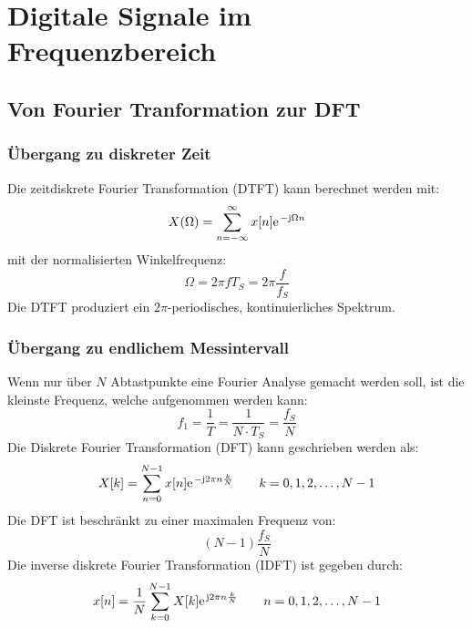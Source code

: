 



\chapter{Digitale Signale im Frequenzbereich}
\section{Von Fourier Tranformation zur DFT}
\subsection{Übergang zu diskreter Zeit}
Die zeitdiskrete Fourier Transformation (DTFT) kann berechnet werden mit:
\[ X(\Omega) = \sum_{n=-\infty}^{\infty} x[n]\e^{-\im\Omega n} \]
mit der normalisierten Winkelfrequenz:
\[ \Omega = 2\pi f T_S = 2\pi\frac{f}{f_S} \]
Die DTFT produziert ein $2\pi$-periodisches, kontinuierliches Spektrum.

\subsection{Übergang zu endlichem Messintervall}
Wenn nur über $N$ Abtastpunkte eine Fourier Analyse gemacht werden soll,
ist die kleinste Frequenz, welche aufgenommen werden kann:
\[ f_1 = \frac{1}{T} = \frac{1}{N \cdot T_S} = \frac{f_S}{N} \]
Die Diskrete Fourier Transformation (DFT) kann geschrieben werden als:
\[ X[k] = \sum_{n=0}^{N-1}x[n] \e^{-\im 2 \pi n \frac{k}{N}} \qquad 
	k = 0,1, 2, \ldots , N-1 \]
Die DFT ist beschränkt zu einer maximalen Frequenz von:
\[ (N-1)\frac{f_S}{N} \]
Die inverse diskrete Fourier Transformation (IDFT) ist gegeben durch:
\[ x[n] = \frac{1}{N} \sum_{k=0}^{N-1} X[k]\e^{\im 2\pi n \frac{k}{N}} 
	\qquad n = 0,1, 2, \ldots , N-1 \]
	
